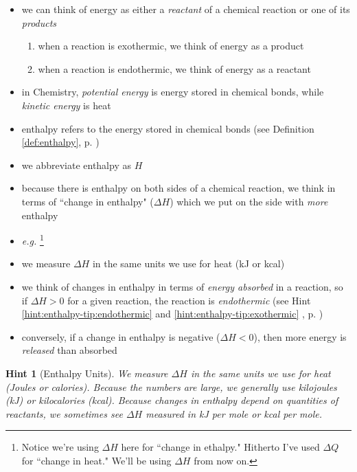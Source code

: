 \documentclass[11pt, oneside]{article}   	%
\newtheorem{hint}{Hint}
\begin{document}
\begin{itemize}
\item we can think of energy as either a \emph{reactant} of a chemical reaction or one of its \emph{products}
\begin{enumerate}
\item when a reaction is exothermic, we think of energy as a product
\item when a reaction is endothermic, we think of energy as a reactant
\end{enumerate}

\item in Chemistry, \emph{potential energy} is energy stored in chemical bonds, while \emph{kinetic energy} is heat
\item enthalpy refers to the energy stored in chemical bonds (see Definition \ref{def:enthalpy}, p. \pageref{def:enthalpy})
\item we abbreviate enthalpy as $H$
\item because there is enthalpy on both sides of a chemical reaction, we think in terms of ``change in enthalpy" ($\Delta H$) which we put on the side with \emph{more} enthalpy
\item \emph{e.g.} 
\footnote{Notice we're using $\Delta H$ here for ``change in ethalpy." Hitherto I've used $\Delta Q$ for ``change in heat." We'll be using $\Delta H$ from now on.}
\item we measure $\Delta H$ in the same units we use for heat (kJ or kcal)
\item we think of changes in enthalpy in terms of \emph{energy absorbed} in a reaction, so if $\Delta H > 0$ for a given reaction, the reaction is \emph{endothermic} (see Hint \ref{hint:enthalpy-tip:endothermic} and \ref{hint:enthalpy-tip:exothermic} , p. \pageref{hint:enthalpy-tip:endothermic})
\item conversely, if a change in enthalpy is negative ($\Delta H < 0$), then more energy is \emph{released} than absorbed
\end{itemize}

\begin{hint}[Enthalpy Units]\label{hint:enthalpy-units}
We measure $\Delta H$ in the same units we use for heat (Joules or calories). 
Because the numbers are large, we generally use kilojoules (kJ) or kilocalories (kcal).
Because changes in enthalpy depend on quantities of reactants, we sometimes see $\Delta H$ measured in kJ \emph{per mole} or kcal \emph{per mole}.
\end{hint}
\end{document}
